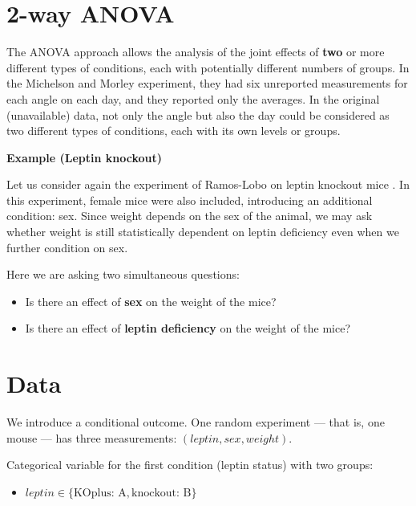 \documentclass[
]{book}
\providecommand{\tightlist}{%
  \setlength{\itemsep}{0pt}\setlength{\parskip}{0pt}}
\begin{document}
\hypertarget{way-anova}{%
\section{2-way ANOVA}\label{way-anova}}

The ANOVA approach allows the analysis of the joint effects of \textbf{two} or more different types of conditions, each with potentially different numbers of groups. In the Michelson and Morley experiment, they had six unreported measurements for each angle on each day, and they reported only the averages. In the original (unavailable) data, not only the angle but also the day could be considered as two different types of conditions, each with its own levels or groups.

\textbf{Example (Leptin knockout)}

Let us consider again the experiment of Ramos-Lobo on leptin knockout mice \citep{Ramos-Lobo2019}. In this experiment, female mice were also included, introducing an additional condition: sex. Since weight depends on the sex of the animal, we may ask whether weight is still statistically dependent on leptin deficiency even when we further condition on sex.

Here we are asking two simultaneous questions:

\begin{itemize}
\tightlist
\item
  Is there an effect of \textbf{sex} on the weight of the mice?\\
\item
  Is there an effect of \textbf{leptin deficiency} on the weight of the mice?
\end{itemize}

\hypertarget{data-5}{%
\section{Data}\label{data-5}}

We introduce a conditional outcome. One random experiment --- that is, one mouse --- has three measurements: \((leptin, sex, weight)\).

Categorical variable for the first condition (leptin status) with two groups:

\begin{itemize}
\tightlist
\item
  \(leptin \in \{\text{KOplus: A}, \text{knockout: B}\}\)
\end{itemize}
\end{document}
